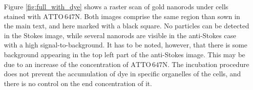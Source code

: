\documentclass[journal=nalefd,manuscript=letter]{achemso}
\newcommand{\atto}{\ensuremath{\textrm{ATTO}\,647\textrm{N}}}
\begin{document}
Figure \ref{fig:full_with_dye} shows a raster scan of gold nanorods under cells
stained with \atto. Both images comprise the same region than sown in the main
text, and here marked with a black square. No particles can be detected in the
Stokes image, while several nanorods are visible in the anti-Stokes case with a
high signal-to-background. It has to be noted, however, that there is some
background appearing in the top left part of the anti-Stokes image. This may be
due to an increase of the concentration of \atto. The incubation procedure does
not prevent the accumulation of dye in specific organelles of the cells, and
there is no control on the end concentration of it. 
\end{document}
